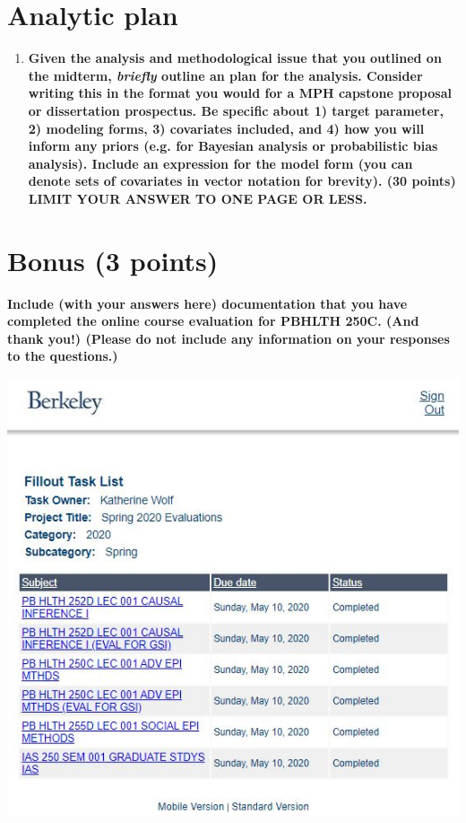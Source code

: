 \documentclass[
  11pt,
]{article}
\begin{document}
\newpage

\section{Analytic plan}

\begin{enumerate}\addtocounter{enumi}{8}

  \item \textbf{Given the analysis and methodological issue that you outlined on the midterm, \textit{briefly} outline an plan for the analysis. Consider writing this in the format you would for a MPH capstone proposal or dissertation prospectus. Be specific about 1) target parameter, 2) modeling forms, 3) covariates included, and 4) how you will inform any priors (e.g. for Bayesian analysis or probabilistic bias analysis). Include an expression for the model form (you can denote sets of covariates in vector notation for brevity). (30 points) LIMIT YOUR ANSWER TO ONE PAGE OR LESS.}

\end{enumerate}

\newpage

\hypertarget{bonus-3-points}{%
\section{Bonus (3 points)}\label{bonus-3-points}}

\textbf{Include (with your answers here) documentation that you have completed the online course evaluation for PBHLTH 250C. (And thank you!) (Please do not include any information on your
responses to the questions.)} \color{black}

\includegraphics{course_evaluation.jpg}
\end{document}
